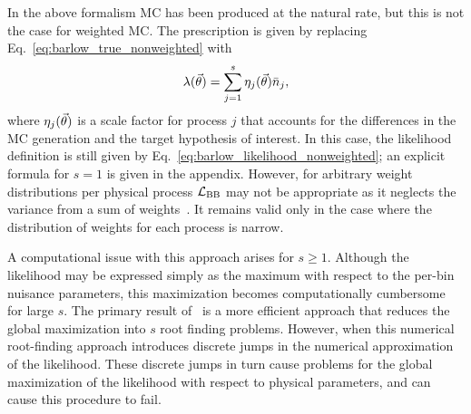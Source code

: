 In the above formalism MC has been produced at the natural rate, but this is not the case for weighted MC.
The prescription is given by replacing Eq.~\eqref{eq:barlow_true_nonweighted} with
\begin{equation}
\lambda(\vec{\theta}) = \sum_{j=1}^s \eta_{j}(\vec{\theta}) \bar n_j,
\label{eq:barlow_true_weighted}
\end{equation}
where $\eta_{j}(\vec{\theta})$ is a scale factor for process $j$ that accounts for the differences in the MC generation and the target hypothesis of interest.
In this case, the likelihood definition is still given by Eq.~\eqref{eq:barlow_likelihood_nonweighted}; an explicit formula for $s=1$ is given in the appendix.
However, for arbitrary weight distributions per physical process $\mathcal{L}_{\textmd{BB}}$ may not be appropriate as it neglects the variance from a sum of weights~\cite{Barlow:1993dm}.
It remains valid only in the case where the distribution of weights for each process is narrow.

A computational issue with this approach arises for $s\geq 1$.
Although the likelihood may be expressed simply as the maximum with respect to the per-bin nuisance parameters, this maximization becomes computationally cumbersome for large $s$.
The primary result of~\cite{Barlow:1993dm} is a more efficient approach that reduces the global maximization into $s$ root finding problems.
However, when this numerical root-finding approach introduces discrete jumps in the numerical approximation of the likelihood.
These discrete jumps in turn cause problems for the global maximization of the likelihood with respect to physical parameters, and can cause this procedure to fail.
